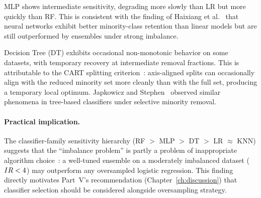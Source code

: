 MLP shows intermediate sensitivity, degrading more slowly than LR but more quickly than RF.
This is consistent with the finding of Haixiang et al.~\cite{haixiang2017learning} that neural networks exhibit better minority-class retention than linear models but are still outperformed by ensembles under strong imbalance.

Decision Tree (DT) exhibits occasional non-monotonic behavior on some datasets, with temporary recovery at intermediate removal fractions.
This is attributable to the CART splitting criterion~\cite{breiman1984cart}: axis-aligned splits can occasionally align with the reduced minority set more cleanly than with the full set, producing a temporary local optimum.
Japkowicz and Stephen~\cite{japkowicz2002class} observed similar phenomena in tree-based classifiers under selective minority removal.

\paragraph{Practical implication.}
The classifier-family sensitivity hierarchy (RF $>$ MLP $>$ DT $>$ LR $\approx$ KNN) suggests that the ``imbalance problem'' is partly a problem of inappropriate algorithm choice~\cite{ling2004exploration}: a well-tuned ensemble on a moderately imbalanced dataset ($IR < 4$) may outperform any oversampled logistic regression.
This finding directly motivates Part~V's recommendation (Chapter~\ref{ch:discussion}) that classifier selection should be considered alongside oversampling strategy.
